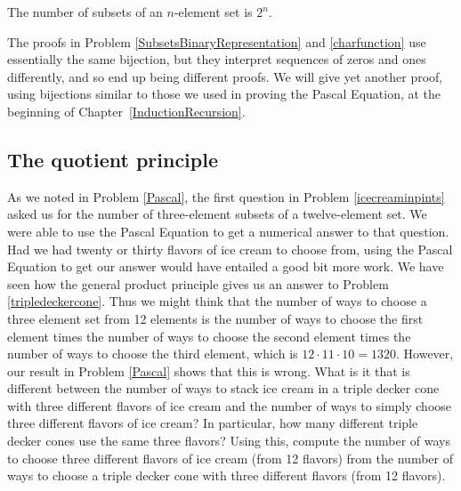 \begin{theorem} The number of subsets of an $n$-element set is
$2^n$.
\end{theorem}


The proofs in Problem \ref{SubsetsBinaryRepresentation} and
\ref{charfunction} use essentially the same bijection, but they
interpret sequences of zeros and ones differently, and so end up being
different proofs. We will give yet another proof, using bijections
similar to those we used in proving the Pascal Equation, at the
beginning of Chapter~\ref{InductionRecursion}.


\subsection{The quotient principle}

\bp
\iteme As we noted in Problem \ref{Pascal}, the first question in
Problem \ref{icecreaminpints} asked us for the number of three-element
subsets of a twelve-element set.  We were able to use the Pascal Equation to
get a numerical answer to that question.  Had we had twenty or thirty flavors
of ice cream to choose from, using the Pascal Equation to get our answer
would have entailed a good bit more work. We have seen how the general
product principle gives us an answer to Problem \ref{tripledeckercone}.  Thus
we might think that the number of ways to choose a three element set from 12
elements is the number of ways to choose the first element times the number
of ways to choose the second element times the number of ways to choose the
third element, which is $12\cdot11\cdot10=1320$.  However, our result in
Problem \ref{Pascal} shows that this is wrong.  What is it that is different
between the number of ways to stack ice cream in  a triple decker cone with
three different flavors of ice cream and the number of ways to simply choose
three different flavors of ice cream?  In particular, how many different
triple decker cones use the same three flavors?  Using this, compute the
number of ways to choose three different flavors of ice cream (from 12
flavors) from the number of ways to choose a triple decker cone with three
different flavors (from 12 flavors).\label{twelvechoosethree}

